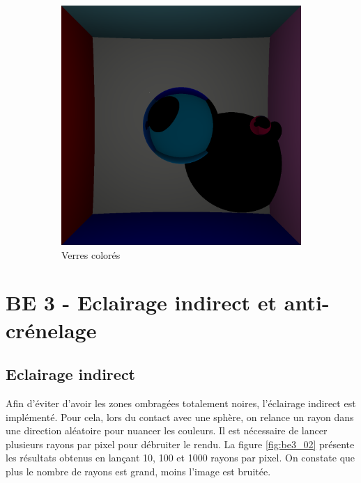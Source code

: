 \documentclass[12pt,a4paper,twoside]{report}
\begin{document}
\begin{figure}[H]
\begin{subfigure}{.45\textwidth}
		\includegraphics[width=1.\linewidth]{be2_08}
		\caption{Verres colorés}
		\label{fig:be2_08}
	\end{subfigure}
	\caption{}
\end{figure}

\newpage\section{BE 3 - Eclairage indirect et anti-crénelage}

\subsection{Eclairage indirect}

Afin d'éviter d'avoir les zones ombragées totalement noires, l'éclairage indirect est implémenté. Pour cela, lors du contact avec une sphère, on relance un rayon dans une direction aléatoire pour nuancer les couleurs. Il est nécessaire de lancer plusieurs rayons par pixel pour débruiter le rendu. La figure \ref{fig:be3_02} présente les résultats obtenus en lançant 10, 100 et 1000 rayons par pixel. On constate que plus le nombre de rayons est grand, moins l'image est bruitée.
\end{document}
